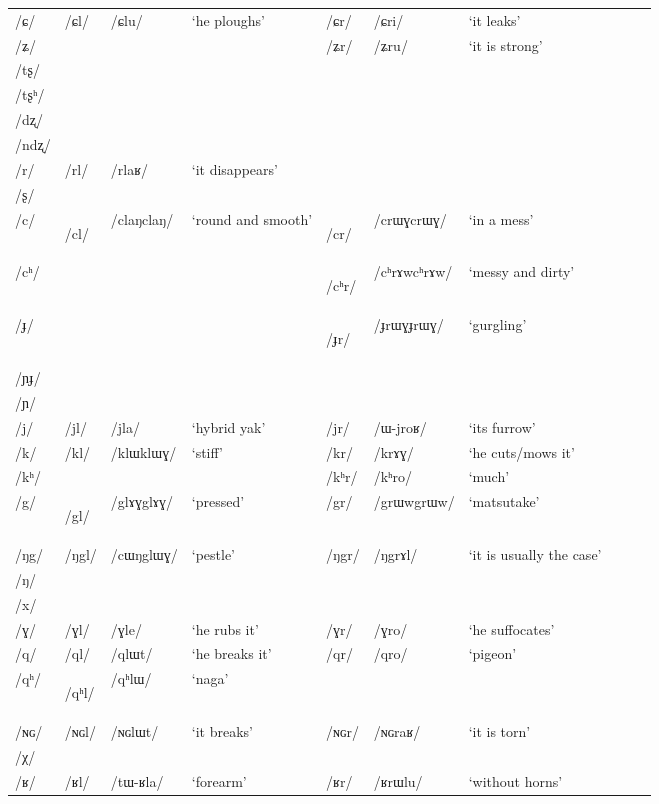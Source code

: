 \documentclass[12pt]{article}
\newcommand{\ipa}[1]{\mbox{\phon/#1/}}
\newcommand{\deux}[1]{\ipa{#1}\addtocounter{2clusters}{1}}
\newcommand{\tib}[1]{\cellcolor{lightgray}\textbf{#1}}
\newcommand{\idph}[1]{\cellcolor{gray}\textbf{#1}}
\begin{document}
\begin{landscape}
\begin{longtable}{llllllllll}
\ipa{ɕ} & \deux{ɕl} & \ipa{ɕlu} & `he ploughs' & \deux{ɕr} & \ipa{ɕri} & `it leaks' \\ 
\ipa{ʑ} & & & & \deux{ʑr} & \ipa{ʑru} & `it is strong' \\ 
\ipa{tʂ} & & & & & & \\ 
\ipa{tʂʰ} & & & & & & \\ 
\ipa{dʐ} & & & & & & \\ 
\ipa{ndʐ} & & & & & & \\ 
\ipa{r} & \deux{rl} & \ipa{rlaʁ} & `it disappears' & & & \\ 
\ipa{ʂ} & & & & & & \\ 
\ipa{c} & \deux{cl} \idph{} & \ipa{claŋclaŋ} & `round and smooth' & \deux{cr} \idph{} & \ipa{crɯɣcrɯɣ} & `in a mess' \\ 
\ipa{cʰ} & & & & \deux{cʰr}\idph{} & \ipa{cʰrɤwcʰrɤw} & `messy and dirty' \\ 
\ipa{ɟ} & & & & \deux{ɟr} \idph{} & \ipa{ɟrɯɣɟrɯɣ} & `gurgling' \\ 
\ipa{ɲɟ} & & & & & & \\ 
\ipa{ɲ} & & & & & & \\ 
\ipa{j} & \deux{jl} & \ipa{jla} & `hybrid yak' & \deux{jr} & \ipa{ɯ-jroʁ} & `its furrow' \\ 
\ipa{k} & \deux{kl} & \ipa{klɯklɯɣ} & `stiff' & \deux{kr} & \ipa{krɤɣ} & `he cuts/mows it' \\ 
\ipa{kʰ} & & & & \deux{kʰr} & \ipa{kʰro} & `much' \\ 
\ipa{g} & \deux{gl} \idph{} & \ipa{glɤɣglɤɣ} & `pressed' & \deux{gr} & \ipa{grɯwgrɯw} & `matsutake' \\ 
\ipa{ŋg} & \deux{ŋgl} & \ipa{cɯŋglɯɣ} & `pestle' & \deux{ŋgr} & \ipa{ŋgrɤl} & `it is usually the case' \\ 
\ipa{ŋ} & & & & & & \\ 
\ipa{x} & & & & & & \\ 
\ipa{ɣ} & \deux{ɣl} & \ipa{ɣle} & `he rubs it' & \deux{ɣr} & \ipa{ɣro} & `he suffocates' \\ 
\ipa{q} & \deux{ql} & \ipa{qlɯt} & `he breaks it' & \deux{qr} & \ipa{qro} & `pigeon' \\ 
\ipa{qʰ} & \deux{qʰl} \tib{} & \ipa{qʰlɯ} & `naga' & & & \\ 
\ipa{ɴɢ} & \deux{ɴɢl} & \ipa{ɴɢlɯt} & `it breaks' & \deux{ɴɢr} & \ipa{ɴɢraʁ} & `it is torn' \\ 
\ipa{χ} & & & & & & \\ 
\ipa{ʁ} & \deux{ʁl} & \ipa{tɯ-ʁla} & `forearm' & \deux{ʁr} & \ipa{ʁrɯlu} & `without horns' \\ 

\end{longtable}
\end{landscape}
\end{document}
